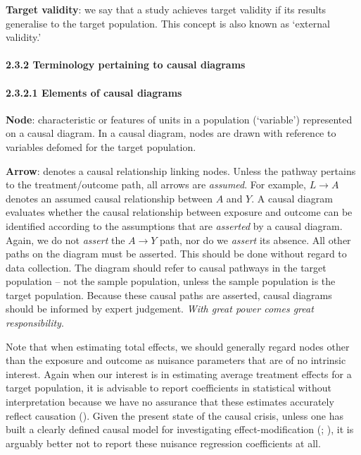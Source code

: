 \documentclass[
  singlecolumn]{article}
\let\oldparagraph\paragraph
\renewcommand{\paragraph}[1]{\oldparagraph{#1}\mbox{}}
\begin{document}
\textbf{Target validity}: we say that a study achieves target validity
if its results generalise to the target population. This concept is also
known as `external validity.'

\paragraph{2.3.2 Terminology pertaining to causal
diagrams}\label{terminology-pertaining-to-causal-diagrams}

\paragraph{2.3.2.1 Elements of causal
diagrams}\label{elements-of-causal-diagrams}

\textbf{Node}: characteristic or features of units in a population
(`variable') represented on a causal diagram. In a causal diagram, nodes
are drawn with reference to variables defomed for the target population.

\textbf{Arrow}: denotes a causal relationship linking nodes. Unless the
pathway pertains to the treatment/outcome path, all arrows are
\emph{assumed}. For example, \(L\to A\) denotes an assumed causal
relationship between \(A\) and \(Y\). A causal diagram evaluates whether
the causal relationship between exposure and outcome can be identified
according to the assumptions that are \emph{asserted} by a causal
diagram. Again, we do not \emph{assert} the \(A\to Y\) path, nor do we
\emph{assert} its absence. All other paths on the diagram must be
asserted. This should be done without regard to data collection. The
diagram should refer to causal pathways in the target population -- not
the sample population, unless the sample population is the target
population. Because these causal paths are asserted, causal diagrams
should be informed by expert judgement. \emph{With great power comes
great responsibility}.

Note that when estimating total effects, we should generally regard
nodes other than the exposure and outcome as nuisance parameters that
are of no intrinsic interest. Again when our interest is in estimating
average treatment effects for a target population, it is advisable to
report coefficients in statistical without interpretation because we
have no assurance that these estimates accurately reflect causation
(). Given the
present state of the causal crisis, unless one has built a clearly
defined causal model for investigating effect-modification
(;
), it is arguably better
not to report these nuisance regression coefficients at all.
\end{document}
